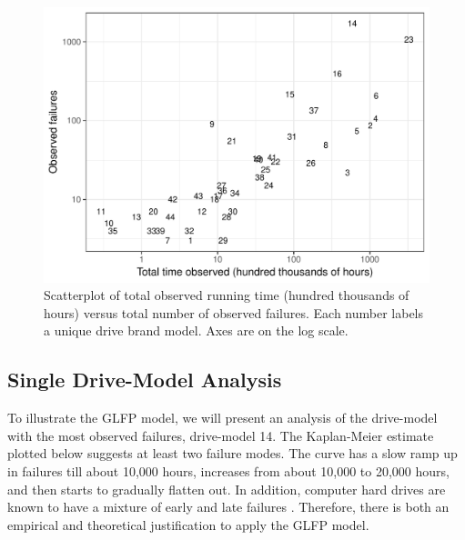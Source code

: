 \documentclass[12pt]{article}
\begin{document}
\begin{figure}[H]
  \includegraphics[width=.9\textwidth]{dm-summ-scatter.pdf}
  \caption{Scatterplot of total observed running time (hundred thousands of hours) versus total number of observed failures.  Each number labels a unique drive brand model.   Axes are on the log scale.}
  \label{fig1}
\end{figure}

\subsection{Single Drive-Model Analysis}
\label{subsec:ex1}
To illustrate the GLFP model, we will present an analysis of the drive-model with the most observed failures, drive-model 14.  The Kaplan-Meier estimate plotted below suggests at least two failure modes.  The curve has a slow ramp up in failures till about 10,000 hours, increases from about 10,000 to 20,000 hours, and then starts to gradually flatten out.  In addition, computer hard drives are known to have a mixture of early and late failures \cite{chan}.  Therefore, there is both an empirical and theoretical justification to apply the GLFP model.
\end{document}
